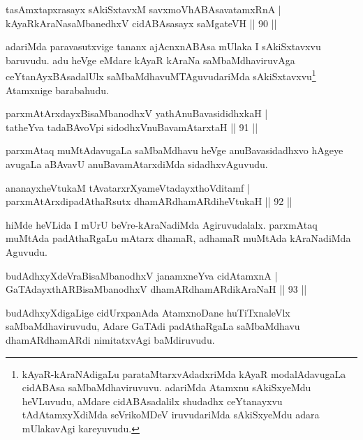 
\begin{shl}
tasAmxtapxrasayx sAkiSxtavxM savxmoVhABAsavatamxRnA |\\
kAyaRkAraNasaMbanedhxV cidABAsasayx saMgateVH \hfill || 90 ||
\end{shl}

\begin{artha}
adariMda paravasutxvige tananx ajAcnxnABAsa mUlaka I sAkiSxtavxvu baruvudu. adu heVge eMdare kAyaR kAraNa saMbaMdhaviruvAga ceYtanAyxBAsadalUlx saMbaMdhavuMTAguvudariMda sAkiSxtavxvu\footnote{kAyaR-kAraNAdigaLu parataMtarxvAdadxriMda kAyaR modalAdavugaLa cidABAsa saMbaMdhaviruvuvu. adariMda Atamxnu sAkiSxyeMdu heVLuvudu, aMdare cidABAsadalilx shudadhx ceYtanayxvu tAdAtamxyXdiMda seVrikoMDeV iruvudariMda sAkiSxyeMdu adara mUlakavAgi kareyuvudu.} Atamxnige barabahudu.
\end{artha}

\begin{shl}
parxmAtArxdayxBisaMbanodhxV yathA\s nuBavasididhxkaH |\\
tatheYva tadaBAvoV\s pi sidodhxV\s nuBavamAtarxtaH \hfill || 91 ||
\end{shl}

\begin{artha}%
parxmAtaq muMtAdavugaLa saMbaMdhavu heVge anuBavasidadhxvo hAgeye avugaLa aBAvavU anuBavamAtarxdiMda sidadhxvAguvudu.
\end{artha}

\begin{shl}
ananayxheVtukaM tAvatarxrXyameVtadayxthoVditamf |\\
parxmAtArxdipadAthaRsutx dhamARdhamARdiheVtukaH \hfill || 92 ||
\end{shl}

\begin{artha}
hiMde heVLida I mUrU beVre-kAraNadiMda Agiruvudalalx. parxmAtaq muMtAda padAthaRgaLu mAtarx dhamaR, adhamaR muMtAda kAraNadiMda Aguvudu.
\end{artha}

\begin{shl}
budAdhxyXdeVraBisaMbanodhxV janamxneYva cidAtamxnA |\\
GaTAdayxthARBisaMbanodhxV dhamARdhamARdikAraNaH \hfill || 93 ||
\end{shl}

\begin{artha}
budAdhxyXdigaLige cidUrxpanAda AtamxnoDane huTiTxnaleVlx saMbaMdhaviruvudu, Adare GaTAdi padAthaRgaLa saMbaMdhavu dhamAR\break dhamARdi nimitatxvAgi baMdiruvudu.
\end{artha}

